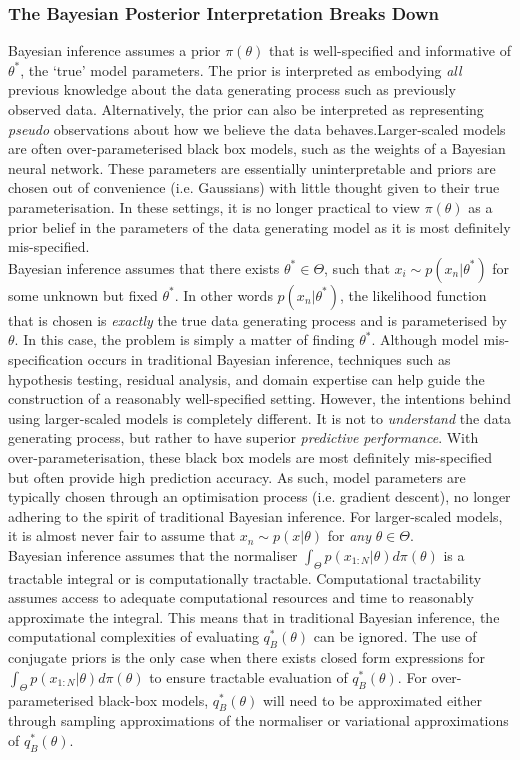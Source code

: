 \documentclass{article}
\numberwithin{equation}{section}
\begin{document}
\subsubsection{The Bayesian Posterior Interpretation Breaks Down}
Bayesian inference assumes a prior $\pi(\theta)$ that is well-specified and informative of $\theta^*$, the `true' model parameters. The prior is interpreted as embodying \textit{all} previous knowledge about the data generating process such as previously observed data. Alternatively, the prior can also be interpreted as representing \textit{pseudo} observations about how we believe the data behaves.Larger-scaled models are often over-parameterised black box models, such as the weights of a Bayesian neural network. These parameters are essentially uninterpretable and priors are chosen out of convenience (i.e. Gaussians) with little thought given to their true parameterisation. In these settings, it is no longer practical to view $\pi(\theta)$ as a prior belief in the parameters of the data generating model as it is most definitely mis-specified.
\\Bayesian inference assumes that there exists $\theta^* \in \Theta$, such that $x_i \sim p(x_n | \theta^*)$ for some unknown but fixed $\theta^*$. In other words $p(x_n | \theta^*)$, the likelihood function that is chosen is \textit{exactly} the true data generating process and is parameterised by $\theta$. In this case, the problem is simply a matter of finding $\theta^*$. Although model mis-specification occurs in traditional Bayesian inference, techniques such as hypothesis testing, residual analysis, and domain expertise can help guide the construction of a reasonably well-specified setting. However, the intentions behind using larger-scaled models is completely different. It is not to \textit{understand} the data generating process, but rather to have superior \textit{predictive performance}. With over-parameterisation, these black box models are most definitely mis-specified but often provide high prediction accuracy. As such, model parameters are typically chosen through an optimisation process (i.e. gradient descent), no longer adhering to the spirit of traditional Bayesian inference. For larger-scaled models, it is almost never fair to assume that $x_n \sim p(x|\theta)$ for \textit{any} $\theta \in \Theta$.
\\Bayesian inference assumes that the normaliser $\int_{\Theta} p(x_{1:N}|\theta) d \pi(\theta)$ is a tractable integral or is computationally tractable. Computational tractability assumes access to  adequate computational resources and time to reasonably approximate the integral. This means that in traditional Bayesian inference, the computational complexities of evaluating $q_B^*(\theta)$ can be ignored. The use of conjugate priors is the only case when there exists closed form expressions for $\int_{\Theta} p(x_{1:N}|\theta) d \pi(\theta)$ to ensure tractable evaluation of $q_B^*(\theta)$. For over-parameterised black-box models, $q_B^*(\theta)$ will need to be approximated either through sampling approximations of the normaliser or variational approximations of $q_B^*(\theta)$.
\end{document}
